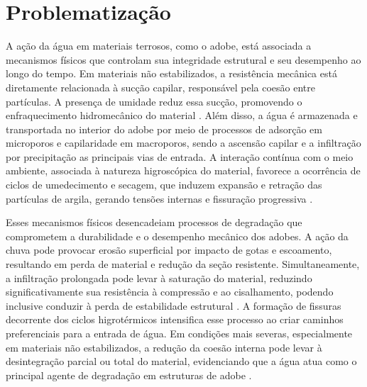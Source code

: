 
\section{Problematização}



A ação da água em materiais terrosos, como o adobe, está associada a mecanismos físicos que controlam sua integridade estrutural e seu desempenho ao longo do tempo. Em materiais não estabilizados, a resistência mecânica está diretamente relacionada à sucção capilar, responsável pela coesão entre partículas. A presença de umidade reduz essa sucção, promovendo o enfraquecimento hidromecânico do material \cite{Gerard2015, Beckett2020, Bui2014}. Além disso, a água é armazenada e transportada no interior do adobe por meio de processos de adsorção em microporos e capilaridade em macroporos, sendo a ascensão capilar e a infiltração por precipitação as principais vias de entrada. A interação contínua com o meio ambiente, associada à natureza higroscópica do material, favorece a ocorrência de ciclos de umedecimento e secagem, que induzem expansão e retração das partículas de argila, gerando tensões internas e fissuração progressiva \cite{Gerard2015, Dieudonne2016, Beckett2020, Bui2014}.


Esses mecanismos físicos desencadeiam processos de degradação que comprometem a durabilidade e o desempenho mecânico dos adobes. A ação da chuva pode provocar erosão superficial por impacto de gotas e escoamento, resultando em perda de material e redução da seção resistente. Simultaneamente, a infiltração prolongada pode levar à saturação do material, reduzindo significativamente sua resistência à compressão e ao cisalhamento, podendo inclusive conduzir à perda de estabilidade estrutural \cite{Gerard2015, Bui2014}. A formação de fissuras decorrente dos ciclos higrotérmicos intensifica esse processo ao criar caminhos preferenciais para a entrada de água. Em condições mais severas, especialmente em materiais não estabilizados, a redução da coesão interna pode levar à desintegração parcial ou total do material, evidenciando que a água atua como o principal agente de degradação em estruturas de adobe \cite{Beckett2020, Ratchakrom2021, Guettatfi2021}. 

